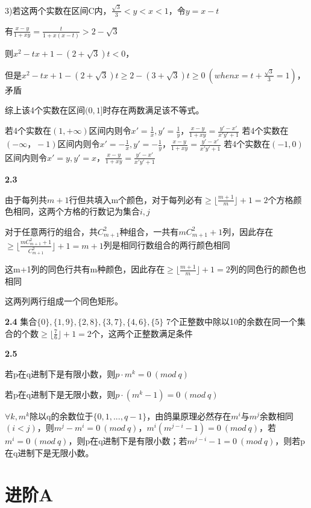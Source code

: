 3)若这两个实数在区间C内，$\frac{\sqrt{3}}{3}<y<x<1$，令$y=x-t$

有$\frac{x-y}{1+xy} = \frac{t}{1+x(x-t)} > 2-\sqrt{3}$

则$x^2-tx+1-(2+\sqrt{3})t < 0$，

但是$x^2-tx+1-(2+\sqrt{3})t \geq 2-(3+\sqrt{3})t \geq 0 \ (when x=t+\frac{\sqrt{3}}{3}=1)$，矛盾

综上该4个实数在区间$(0,1]$时存在两数满足该不等式。

若4个实数在$(1,+\infty)$区间内则令$x'=\frac{1}{x},y'=\frac{1}{y}$，$\frac{x-y}{1+xy}=\frac{y'-x'}{x'y'+1}$
若4个实数在$(-\infty，-1)$区间内则令$x'=-\frac{1}{x},y'=-\frac{1}{y}$，$\frac{x-y}{1+xy}=\frac{y'-x'}{x'y'+1}$
若4个实数在$(-1,0)$区间内则令$x'=y,y'=x$，$\frac{x-y}{1+xy}=\frac{y'-x'}{x'y'+1}$


\vspace{5mm} %
\noindent{}\textbf{2.3}

由于每列共$m+1$行但共填入m个颜色，对于每列必有$\geq \lfloor\frac{m+1}{m}\rfloor+1=2$个方格颜色相同，这两个方格的行数记为集合${i,j}$

对于任意两行的组合，共$C_{m+1}^2$种组合，一共有$mC_{m+1}^2+1$列，因此存在$\geq \lfloor\frac{mC_{m+1}^2+1}{C_{m+1}^2}\rfloor+1=m+1$列是相同行数组合的两行颜色相同

这m+1列的同色行共有m种颜色，因此存在$\geq \lfloor\frac{m+1}{m}\rfloor+1=2$列的同色行的颜色也相同

这两列两行组成一个同色矩形。

\vspace{5mm} %
\noindent{}\textbf{2.4}
集合$\{0\},\{1,9\},\{2,8\},\{3,7\},\{4,6\},\{5\}$
7个正整数中除以10的余数在同一个集合的个数$\geq \lfloor\frac{7}{6}\rfloor+1=2$个，这两个正整数满足条件


\vspace{5mm} %
\noindent{}\textbf{2.5}

若p在q进制下是有限小数，则$p\cdot m^k=0\ (mod\ q)$

若p在q进制下是无限小数，则$p\cdot (m^k-1)=0\ (mod\ q)$

$\forall k, m^k$除以q的余数位于$\{0,1,...,q-1\}$，由鸽巢原理必然存在$m^i$与$m^j$余数相同$(i<j)$，则$m^j-m^i=0\ (mod\ q)$，$m^i(m^{j-i}-1)=0\ (mod\ q)$，若$m^i=0\ (mod\ q)$，则p在q进制下是有限小数；若$m^{j-i}-1=0\ (mod\ q)$，则若p在q进制下是无限小数。


\section{进阶A}


